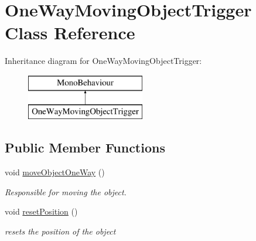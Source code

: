 \hypertarget{class_one_way_moving_object_trigger}{}\section{One\+Way\+Moving\+Object\+Trigger Class Reference}
\label{class_one_way_moving_object_trigger}
Inheritance diagram for One\+Way\+Moving\+Object\+Trigger\+:\begin{figure}[H]
\begin{center}
\leavevmode
\includegraphics[height=2.000000cm]{class_one_way_moving_object_trigger}
\end{center}
\end{figure}
\subsection*{Public Member Functions}
\begin{DoxyCompactItemize}
\item 
void \hyperlink{class_one_way_moving_object_trigger_a5ca6243e428f0bf25078650bce538acf}{move\+Object\+One\+Way} ()
\begin{DoxyCompactList}\small\item\em Responsible for moving the object. \end{DoxyCompactList}\item 
void \hyperlink{class_one_way_moving_object_trigger_a4005f31ac588ca0362062a12061f1739}{reset\+Position} ()
\begin{DoxyCompactList}\small\item\em resets the position of the object \end{DoxyCompactList}\end{DoxyCompactItemize}
